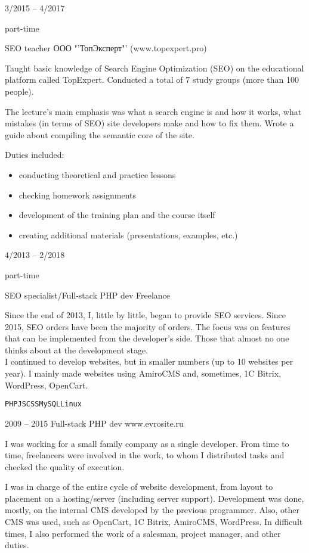 \begin{entrylist}
	\entry
		{3/2015 -- 4/2017

		\footnotesize{part-time}}
		{SEO teacher}
		{ООО "'ТопЭксперт"' (www.topexpert.pro)}
		{Taught basic knowledge of Search Engine Optimization (SEO) on the educational platform called TopExpert. Conducted a total of 7 study groups (more than 100 people).

    The lecture's main emphasis was what a search engine is and how it works, what mistakes (in terms of SEO) site developers make and how to fix them. Wrote a guide about compiling the semantic core of the site.

    Duties included:
    \begin{itemize}
      \item conducting theoretical and practice lessons
      \item checking homework assignments
      \item development of the training plan and the course itself
      \item creating additional materials (presentations, examples, etc.)
    \end{itemize}
    }

	\entry
		{4/2013 -- 2/2018

		\footnotesize{part-time}}
		{SEO specialist/Full-stack PHP dev}
		{Freelance}
    {Since the end of 2013, I, little by little, began to provide SEO services. Since 2015, SEO orders have been the majority of orders. The focus was on features that can be implemented from the developer's side. Those that almost no one thinks about at the development stage.\\
    I continued to develop websites, but in smaller numbers (up to 10 websites per year). I mainly made websites using AmiroCMS and, sometimes, 1C Bitrix, WordPress, OpenCart.

		\texttt{PHP}\slashsep\texttt{JS}\slashsep\texttt{CSS}\slashsep\texttt{MySQL}\slashsep\texttt{Linux}}

  \entry
    {2009 -- 2015}
    {Full-stack PHP dev}
    {www.evrosite.ru}
    {I was working for a small family company as a single developer. From time to time, freelancers were involved in the work, to whom I distributed tasks and checked the quality of execution.

    I was in charge of the entire cycle of website development, from layout to placement on a hosting/server (including server support). Development was done, mostly, on the internal CMS developed by the previous programmer. Also, other CMS was used, such as OpenCart, 1C Bitrix, AmiroCMS, WordPress. In difficult times, I also performed the work of a salesman, project manager, and other duties.

}
\end{entrylist}
